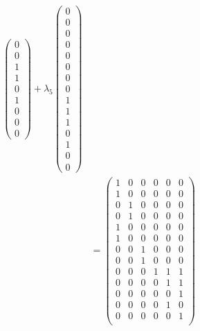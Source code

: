 \begin{align*}
\begin{pmatrix}
             0 \\
             0 \\
             1 \\
             1 \\
             0 \\
             1 \\
             0 \\
             0 \\
             0
           \end{pmatrix}
         + \lambda_5
           \begin{pmatrix}
             0 \\
             0 \\
             0 \\
             0 \\
             0 \\
             0 \\
             0 \\
             0 \\
             1 \\
             1 \\
             1 \\
             0 \\
             1 \\
             0 \\
             0
           \end{pmatrix} \\
      &= \begin{pmatrix}
           1 & 0 & 0 & 0 & 0 & 0 \\
           1 & 0 & 0 & 0 & 0 & 0 \\
           0 & 1 & 0 & 0 & 0 & 0 \\
           0 & 1 & 0 & 0 & 0 & 0 \\
           1 & 0 & 0 & 0 & 0 & 0 \\
           1 & 0 & 0 & 0 & 0 & 0 \\
           0 & 0 & 1 & 0 & 0 & 0 \\
           0 & 0 & 1 & 0 & 0 & 0 \\
           0 & 0 & 0 & 1 & 1 & 1 \\
           0 & 0 & 0 & 0 & 1 & 1 \\
           0 & 0 & 0 & 0 & 0 & 1 \\
           0 & 0 & 0 & 0 & 1 & 0 \\
           0 & 0 & 0 & 0 & 0 & 1 \\

\end{pmatrix}
\end{align*}
